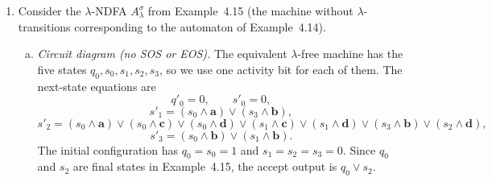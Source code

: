 \begin{enumerate}[{4.}1.]
\begin{enumerate}[(a)]
  \item \textbf{Comparison.}  This is actually \emph{easier} than the
  $\lambda$-transition approach (Exercise~4.12): no new states are needed at
  all, since we simply merge the state sets and initial-state sets.

  \item \textbf{Can we ensure exactly one start state and one final state?}
  Not in full generality.  The disjoint-union construction in part~(a) gives a
  correct union machine, but it usually has several start states and several
  final states.  If the resulting language does \emph{not} contain $\lambda$,
  then Exercise~4.22 shows how to convert a no-$\lambda$ NDFA into another
  no-$\lambda$ NDFA with exactly one start state and exactly one final state.
  But Exercise~4.23 shows that this can fail when $\lambda$ is in the language.
  So the correct conclusion is: one start state and one final state can be
  forced under the hypothesis $\lambda\notin L$, but not uniformly in general.
\end{enumerate}

\item Consider the $\lambda$-NDFA $A^{\sigma}_\lambda$ from Example~4.15 (the
machine without $\lambda$-transitions corresponding to the automaton of
Example~4.14).

\begin{enumerate}[(a)]
  \item \emph{Circuit diagram (no SOS or EOS).}
  The equivalent $\lambda$-free machine has the five states
  $q_0,s_0,s_1,s_2,s_3$, so we use one activity bit for each of them.  The
  next-state equations are
  \[
    q'_0=0,\qquad s'_0=0,
  \]
  \[
    s'_1=(s_0\wedge \pmb{a})\vee(s_3\wedge \pmb{b}),
  \]
  \[
    s'_2=(s_0\wedge \pmb{a})\vee(s_0\wedge \pmb{c})\vee(s_0\wedge \pmb{d})
       \vee(s_1\wedge \pmb{c})\vee(s_1\wedge \pmb{d})
       \vee(s_3\wedge \pmb{b})\vee(s_2\wedge \pmb{d}),
  \]
  \[
    s'_3=(s_0\wedge \pmb{b})\vee(s_1\wedge \pmb{b}).
  \]
  The initial configuration has $q_0=s_0=1$ and $s_1=s_2=s_3=0$.  Since
  $q_0$ and $s_2$ are final states in Example~4.15, the accept output is
  $q_0\vee s_2$.


\end{enumerate}
\end{enumerate}
